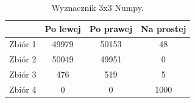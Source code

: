 \documentclass[11pt]{scrartcl}
\begin{document}
    \begin{table}[H]
        \centering
        \renewcommand{\arraystretch}{1.5}
        \begin{tabular}{| c | c | c | c |}
            \hline
            & Po lewej & Po prawej & Na prostej \\
            \hline
            Zbiór 1 & 49979 & 50153 & 48 \\
            \hline
            Zbiór 2 & 50049 & 49951 & 0 \\
            \hline
            Zbiór 3 & 476 & 519 & 5 \\
            \hline
            Zbiór 4 & 0 & 0 & 1000 \\
            \hline
        \end{tabular}
        \renewcommand{\arraystretch}{1.5}
        \caption{Wyznacznik 3x3 Numpy.}
    \end{table}
\end{document}
